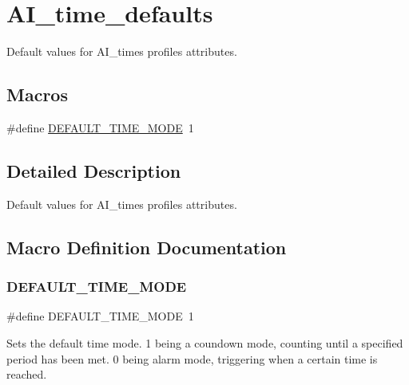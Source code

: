 \hypertarget{group__AI__time__defaults}{}\section{A\+I\+\_\+time\+\_\+defaults}
\label{group__AI__time__defaults}


Default values for A\+I\+\_\+time\textquotesingle{}s profile\textquotesingle{}s attributes.  


\subsection*{Macros}
\begin{DoxyCompactItemize}
\item 
\#define \hyperlink{group__AI__time__defaults_gade503f094ed5474a5a8be55ac76223ed}{D\+E\+F\+A\+U\+L\+T\+\_\+\+T\+I\+M\+E\+\_\+\+M\+O\+DE}~1
\end{DoxyCompactItemize}


\subsection{Detailed Description}
Default values for A\+I\+\_\+time\textquotesingle{}s profile\textquotesingle{}s attributes. 



\subsection{Macro Definition Documentation}
\mbox{\label{group__AI__time__defaults_gade503f094ed5474a5a8be55ac76223ed}} 
\subsubsection{\texorpdfstring{D\+E\+F\+A\+U\+L\+T\+\_\+\+T\+I\+M\+E\+\_\+\+M\+O\+DE}{DEFAULT\_TIME\_MODE}}
{\footnotesize\ttfamily \#define D\+E\+F\+A\+U\+L\+T\+\_\+\+T\+I\+M\+E\+\_\+\+M\+O\+DE~1}

Sets the default time mode. 1 being a coundown mode, counting until a specified period has been met. 0 being alarm mode, triggering when a certain time is reached. 